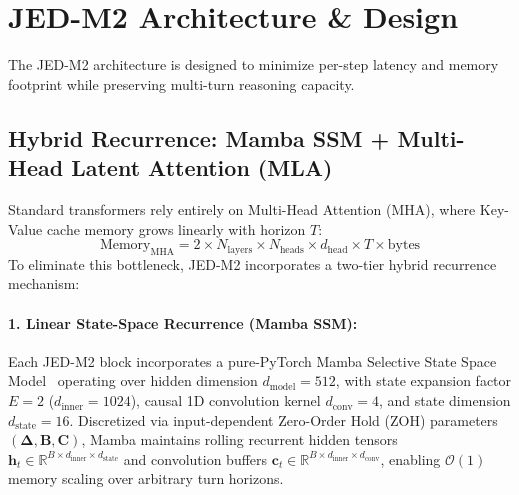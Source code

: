 \documentclass[10pt,twocolumn,letterpaper]{article}
\begin{document}
\section{JED-M2 Architecture \& Design}
\label{sec:architecture}

The JED-M2 architecture is designed to minimize per-step latency and memory footprint while preserving multi-turn reasoning capacity.

\subsection{Hybrid Recurrence: Mamba SSM + Multi-Head Latent Attention (MLA)}

Standard transformers rely entirely on Multi-Head Attention (MHA), where Key-Value cache memory grows linearly with horizon $T$:
\begin{equation}
\text{Memory}_{\text{MHA}} = 2 \times N_{\text{layers}} \times N_{\text{heads}} \times d_{\text{head}} \times T \times \text{bytes}
\end{equation}
To eliminate this bottleneck, JED-M2 incorporates a two-tier hybrid recurrence mechanism:

\paragraph{1. Linear State-Space Recurrence (Mamba SSM):} Each JED-M2 block incorporates a pure-PyTorch Mamba Selective State Space Model~\cite{gu2023mamba} operating over hidden dimension $d_{\text{model}} = 512$, with state expansion factor $E=2$ ($d_{\text{inner}} = 1024$), causal 1D convolution kernel $d_{\text{conv}} = 4$, and state dimension $d_{\text{state}} = 16$. Discretized via input-dependent Zero-Order Hold (ZOH) parameters $(\mathbf{\Delta}, \mathbf{B}, \mathbf{C})$, Mamba maintains rolling recurrent hidden tensors $\mathbf{h}_t \in \mathbb{R}^{B \times d_{\text{inner}} \times d_{\text{state}}}$ and convolution buffers $\mathbf{c}_t \in \mathbb{R}^{B \times d_{\text{inner}} \times d_{\text{conv}}}$, enabling $\mathcal{O}(1)$ memory scaling over arbitrary turn horizons.
\end{document}
